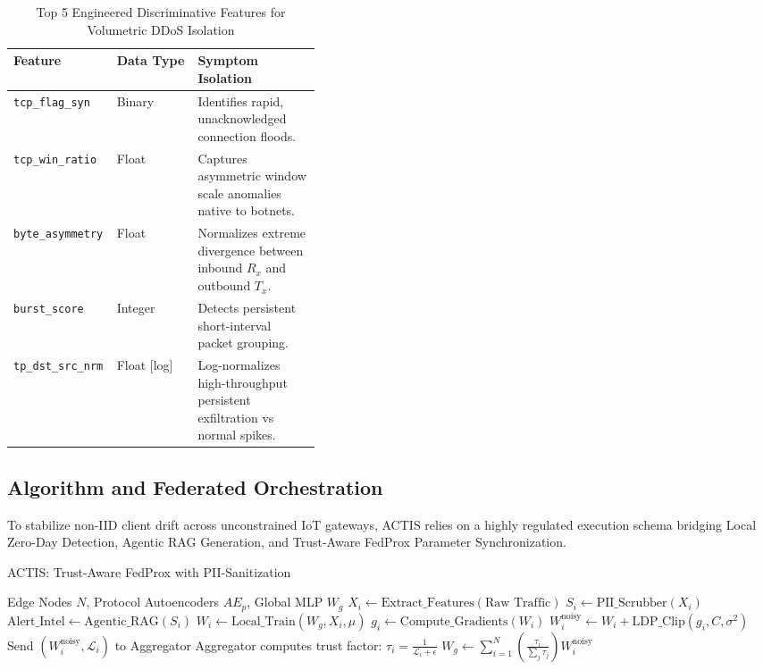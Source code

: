 \documentclass[conference]{IEEEtran}
\begin{document}
\begin{table}[htbp]
\caption{Top 5 Engineered Discriminative Features for Volumetric DDoS Isolation}
\begin{center}
\begin{tabular}{|l|l|p{0.4\linewidth}|}
\hline
\textbf{Feature} & \textbf{Data Type} & \textbf{Symptom Isolation} \\
\hline
\texttt{tcp\_flag\_syn} & Binary & Identifies rapid, unacknowledged connection floods. \\
\hline
\texttt{tcp\_win\_ratio} & Float & Captures asymmetric window scale anomalies native to botnets. \\
\hline
\texttt{byte\_asymmetry} & Float & Normalizes extreme divergence between inbound $R_x$ and outbound $T_x$. \\
\hline
\texttt{burst\_score} & Integer & Detects persistent short-interval packet grouping. \\
\hline
\texttt{tp\_dst\_src\_nrm} & Float [log] & Log-normalizes high-throughput persistent exfiltration vs normal spikes. \\
\hline
\end{tabular}
\label{tab:features}
\end{center}
\end{table}

\subsection{Algorithm and Federated Orchestration}
To stabilize non-IID client drift across unconstrained IoT gateways, ACTIS relies on a highly regulated execution schema bridging Local Zero-Day Detection, Agentic RAG Generation, and Trust-Aware FedProx Parameter Synchronization.
\begin{algorithm}[htbp]
\caption{ACTIS: Trust-Aware FedProx with PII-Sanitization}
\begin{algorithmic}[1]
\REQUIRE Edge Nodes $N$, Protocol Autoencoders $AE_p$, Global MLP $W_g$
  \STATE $X_i \gets \text{Extract\_Features}(\text{Raw Traffic})$
    \STATE $S_i \gets \text{PII\_Scrubber}(X_i)$
    \STATE $\text{Alert\_Intel} \gets \text{Agentic\_RAG}(S_i)$
  \ENDIF
  \STATE $W_i \gets \text{Local\_Train}(W_g, X_i, \mu)$
  \STATE $g_i \gets \text{Compute\_Gradients}(W_i)$
  \STATE $W_i^{\text{noisy}} \gets W_i + \text{LDP\_Clip}(g_i, C, \sigma^2)$
  \STATE Send $(W_i^{\text{noisy}}, \mathcal{L}_i)$ to Aggregator
\ENDFOR
\STATE Aggregator computes trust factor: $\tau_i = \frac{1}{\mathcal{L}_i + \epsilon}$
\STATE $W_g \gets \sum_{i=1}^N \left( \frac{\tau_i}{\sum_j \tau_j} \right) W_i^{\text{noisy}}$
\end{algorithmic}
\label{alg:fedprox}
\end{algorithm}
\end{document}
